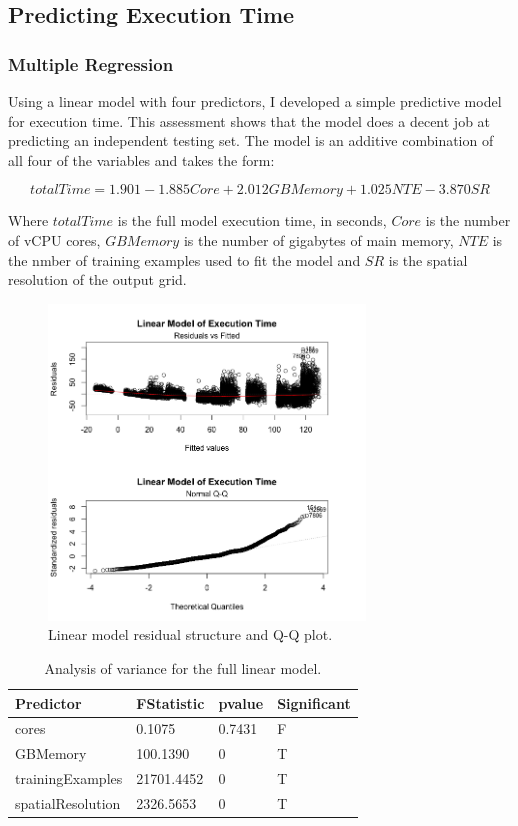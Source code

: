\documentclass[a4paper]{article}
\begin{document}
\subsection{Predicting Execution Time}
\subsubsection{Multiple Regression}
Using a linear model with four predictors, I developed a simple predictive model for execution time.  This assessment shows that the model does a decent job at predicting an independent testing set.  The model is an additive combination of all four of the variables and takes the form:


\[totalTime = 1.901 - 1.885Core +  2.012GBMemory + 1.025NTE - 3.870SR \]

Where $totalTime$ is the full model execution time, in seconds, $Core$ is the number of vCPU cores, $GBMemory$ is the number of gigabytes of main memory, $NTE$ is the nmber of training examples used to fit the model and $SR$ is the spatial resolution of the output grid.


\begin{figure}
\centering
\includegraphics[width=0.75\textwidth]{residuals_and_QQ.png}
\caption{\label{fig:modelStats}Linear model residual structure and Q-Q plot.}
\end{figure}

\begin{table}
\centering
\begin{tabular}{l|l| l | l|}
Predictor & FStatistic & pvalue & Significant\\\hline
cores & 0.1075 & 0.7431 & F\\
GBMemory & 100.1390 & 0 & T\\
trainingExamples & 21701.4452 & 0 & T\\
spatialResolution & 2326.5653 & 0 & T\\
\end{tabular}
\caption{\label{tab:anova}Analysis of variance for the full linear model.}
\end{table}
\end{document}

